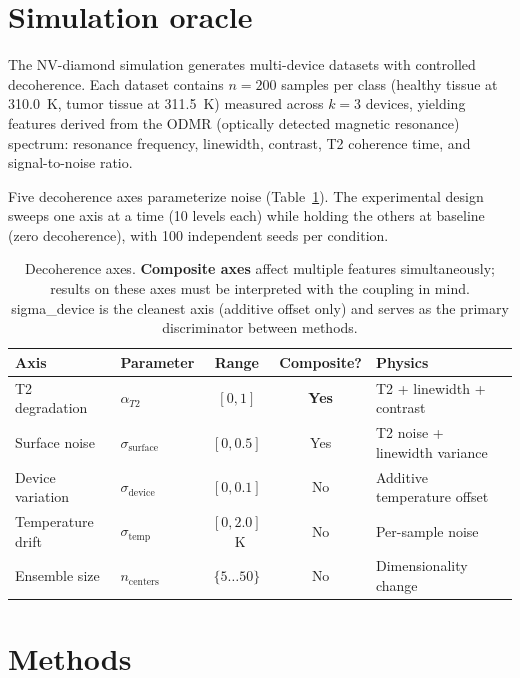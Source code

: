 \documentclass[11pt]{article}
\begin{document}
\section{Simulation oracle}
\label{sec:oracle}

The NV-diamond simulation generates multi-device datasets with controlled
decoherence.  Each dataset contains $n = 200$ samples per class (healthy
tissue at 310.0~K, tumor tissue at 311.5~K) measured across $k = 3$
devices, yielding features derived from the ODMR (optically detected
magnetic resonance) spectrum: resonance frequency, linewidth, contrast,
T2 coherence time, and signal-to-noise ratio.

Five decoherence axes parameterize noise (Table~\ref{tab:axes}).  The
experimental design sweeps one axis at a time (10 levels each) while
holding the others at baseline (zero decoherence), with 100 independent
seeds per condition.

\begin{table}[t]
\centering
\caption{Decoherence axes.  \textbf{Composite axes} affect multiple
  features simultaneously; results on these axes must be interpreted
  with the coupling in mind.  sigma\_device is the cleanest axis
  (additive offset only) and serves as the primary discriminator
  between methods.}
\label{tab:axes}
\begin{tabular}{@{}llccl@{}}
\toprule
Axis & Parameter & Range & Composite? & Physics \\
\midrule
T2 degradation & $\alpha_{T2}$ & $[0, 1]$ & \textbf{Yes} & T2 + linewidth + contrast \\
Surface noise & $\sigma_\text{surface}$ & $[0, 0.5]$ & Yes & T2 noise + linewidth variance \\
Device variation & $\sigma_\text{device}$ & $[0, 0.1]$ & No & Additive temperature offset \\
Temperature drift & $\sigma_\text{temp}$ & $[0, 2.0]$~K & No & Per-sample noise \\
Ensemble size & $n_\text{centers}$ & $\{5 \ldots 50\}$ & No & Dimensionality change \\
\bottomrule
\end{tabular}
\end{table}

\section{Methods}
\label{sec:methods}
\end{document}
